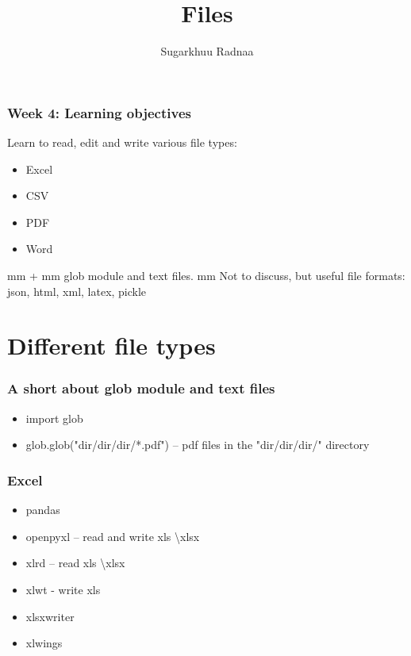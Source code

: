 \documentclass{beamer}
\title[Introduction to Python]{Files}
\author{Sugarkhuu Radnaa}
\institute[]
{
Py4Econ in Ulaanbaatar \\ 
\medskip
\textit{py4econ@gmail.com} 
}
\date{}  %
\begin{document}
\begin{frame}
\titlepage %
\end{frame}

\begin{frame}
    \frametitle{Week 4: Learning objectives}
Learn to read, edit and write various file types: 
    \begin{itemize}
        \item Excel
        \item CSV
        \item PDF 
        \item Word
    \end{itemize}
 mm
+
 mm
glob module and text files.
 mm
Not to discuss, but useful file formats: json, html, xml, latex, pickle

\end{frame}

\section{Different file types} 

\begin{frame}
    \frametitle{A short about glob module and text files}
            \begin{itemize}
                \item import glob
                \item glob.glob("dir/dir/dir/*.pdf") – pdf files in the "dir/dir/dir/" directory
                
            \end{itemize}
\end{frame}

\begin{frame}
    \frametitle{Excel}
            \begin{itemize}
                \item pandas
                \item openpyxl – read and write xls \textbackslash xlsx
                \item xlrd – read xls \textbackslash xlsx
                \item xlwt - write xls
                \item xlsxwriter
                \item xlwings
            \end{itemize}
\end{frame}
\end{document}
